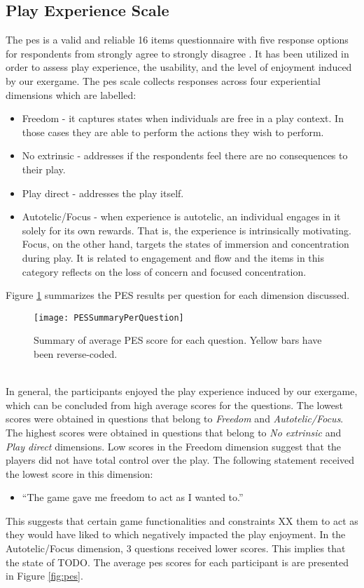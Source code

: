\subsection{Play Experience Scale}
The \acrfull{pes} is a valid and reliable 16 items questionnaire with five response options for respondents from strongly agree to strongly disagree \cite{pavlas2012play}. It has been utilized in order to assess play experience, the usability, and the level of enjoyment induced by our exergame. The \gls{pes} scale collects responses across four experiential dimensions which are labelled: \begin{itemize}
\item Freedom - it captures states when individuals are free in a play context. In those cases they are able to perform the actions they wish to perform.
\item No extrinsic - addresses if the respondents feel there are no consequences to their play.
\item Play direct - addresses the play itself.
\item Autotelic/Focus - when experience is autotelic, an individual engages in it solely for its own rewards. That is, the experience is intrinsically motivating.  Focus, on the other hand, targets the states of immersion and concentration during play. It is related to engagement and flow and the items in this category  reflects on the loss of concern and focused concentration.
\end{itemize}
Figure \ref{fig:pesPerQuestion} summarizes the PES results per question for each dimension discussed.\\
\begin{figure}[h]
    \centering
    \texttt{[image: PESSummaryPerQuestion]}
    \caption{Summary of average PES score for each question. Yellow bars have been reverse-coded.}
    \label{fig:pesPerQuestion}
\end{figure}\\
In general, the participants enjoyed the play experience induced by our exergame, which can be concluded from high average scores for the questions. The lowest scores were obtained in questions that belong to \textit{Freedom} and \textit{Autotelic/Focus}.  The highest  scores were obtained in questions that belong to \textit{No extrinsic} and \textit{Play direct} dimensions. Low scores in the Freedom dimension suggest that the players did not have total control over the play. The following statement received the lowest score in this dimension: 
\begin{itemize}
\item ``The game gave me freedom to act as I wanted to.''
\end{itemize} This suggests that certain  game functionalities and constraints XX them to act as they would have liked to which negatively impacted the play enjoyment.  In the Autotelic/Focus dimension, 3 questions received lower scores. This implies that the state of  TODO. The average \gls{pes} scores for each participant is are presented in Figure \ref{fig:pes}.\\
